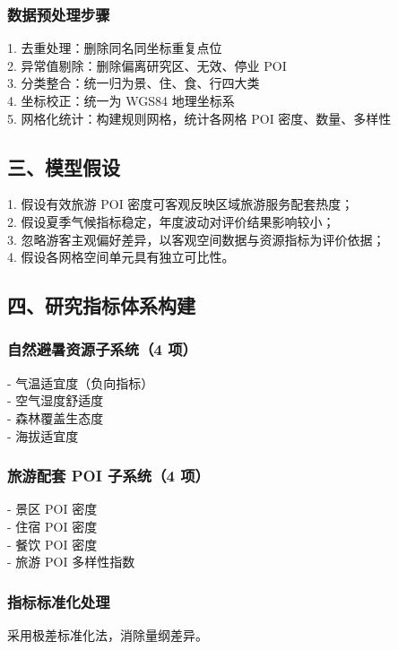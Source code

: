 \subsubsection*{数据预处理步骤}
1. 去重处理：删除同名同坐标重复点位 \\
2. 异常值剔除：删除偏离研究区、无效、停业 POI \\
3. 分类整合：统一归为景、住、食、行四大类 \\
4. 坐标校正：统一为 WGS84 地理坐标系 \\
5. 网格化统计：构建规则网格，统计各网格 POI 密度、数量、多样性 \\

\subsection*{三、模型假设}
1. 假设有效旅游 POI 密度可客观反映区域旅游服务配套热度； \\
2. 假设夏季气候指标稳定，年度波动对评价结果影响较小；\\
3. 忽略游客主观偏好差异，以客观空间数据与资源指标为评价依据； \\
4. 假设各网格空间单元具有独立可比性。 \\

\subsection*{四、研究指标体系构建}
\subsubsection*{自然避暑资源子系统（4 项）}
- 气温适宜度（负向指标）\\
- 空气湿度舒适度 \\
- 森林覆盖生态度  \\
- 海拔适宜度   \\
\subsubsection*{旅游配套 POI 子系统（4 项）}
- 景区 POI 密度  \\
- 住宿 POI 密度  \\
- 餐饮 POI 密度  \\
- 旅游 POI 多样性指数 \\
\subsubsection*{指标标准化处理}
采用极差标准化法，消除量纲差异。
